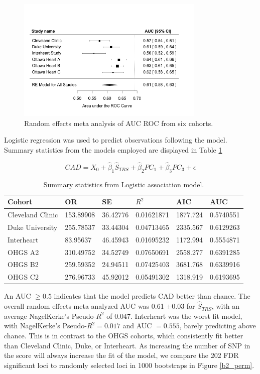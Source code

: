 \begin{figure}[h]
\label{trs_meta}
\caption{Random effects meta analysis of AUC ROC from six cohorts.}
\centering
\includegraphics[width=0.8\textwidth]{Figures/trs_meta.png}
\end{figure}

Logistic regression was used to predict observations following the model. Summary statistics from the models employed are displayed in Table \ref{trs}

$$ CAD = X_0 + \hat{\beta}_1 \hat{S}_{TRS} + \hat{\beta}_2 PC_1 + \hat{\beta}_3 PC_3 + \epsilon $$

\begin{table}[H]
\centering
\caption{Summary statistics from Logistic association model. }
\label{trs}
\begin{tabular}{llllll}
\hline
Cohort           & OR        & SE       & $R^2$      & AIC      & AUC       \\ \hline
Cleveland Clinic & 153.89908 & 36.42776 & 0.01621871 & 1877.724 & 0.5740551 \\
Duke University  & 255.78537 & 33.44304 & 0.04713465 & 2335.567 & 0.6129263 \\
Interheart       & 83.95637  & 46.45943 & 0.01695232 & 1172.994 & 0.5554871 \\
OHGS A2          & 310.49752 & 34.52749 & 0.07650691 & 2558.277 & 0.6391285 \\
OHGS B2          & 259.59352 & 24.94511 & 0.07425403 & 3681.768 & 0.6339916 \\
OHGS C2          & 276.96733 & 45.92012 & 0.05491302 & 1318.919 & 0.6193695 \\ \hline
\end{tabular}
\end{table}

An \ac{AUC} $\geq 0.5$ indicates that the model predicts CAD better than chance. The overall random effects meta analyzed \ac{AUC} was 0.61 $\pm 0.03$ for $\hat{S}_{TRS}$, with an average NagelKerke's Pseudo-$R^2$ of $0.047$. Interheart was the worst fit model, with NagelKerke's Pseudo-$R^2 = 0.017$ and \ac{AUC} $= 0.555$, barely predicting above chance. This is in contrast to the OHGS cohorts, which consistently fit better than Cleveland Clinic, Duke, or Interheart. As increasing the number of \acs{SNP} in the score will always increase the fit of the model, we compare the 202 FDR significant loci to randomly selected loci in 1000 bootstraps in Figure \ref{b2_perm}. 

